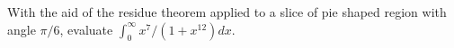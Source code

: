 With the aid of the residue theorem applied to a slice of pie shaped
region with angle $\pi/6$, evaluate $\int_0^{\infty}x^7/(1+x^{12})dx$.
